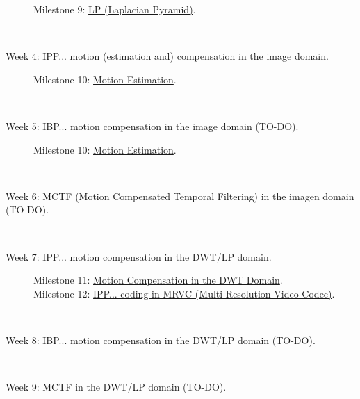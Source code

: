 \begin{description}
\begin{description}
  \item [Milestone 9: {\normalfont \href{}{LP (Laplacian Pyramid)}.}]
  \end{description}
  ~\newline
\item [Week 4: {\normalfont IPP... motion (estimation and) compensation in the image domain.}]
  \begin{description}
  \item [Milestone 10: {\normalfont \href{https://sistemas-multimedia.github.io/milestones/10-ME/}{Motion Estimation}.}] %
  \end{description}
  ~\newline
\item [Week 5: {\normalfont IBP... motion compensation in the image domain (TO-DO).}]
  \begin{description}
  \item [Milestone 10: {\normalfont \href{https://sistemas-multimedia.github.io/milestones/10-ME/}{Motion Estimation}.}] %
  \end{description}
  ~\newline
\item [Week 6: {\normalfont MCTF (Motion Compensated Temporal Filtering) in the imagen domain (TO-DO).}]
  ~\newline
\item [Week 7: {\normalfont IPP... motion compensation in the DWT/LP domain.}]
  \begin{description}
  \item [Milestone 11: {\normalfont \href{https://sistemas-multimedia.github.io/milestones/11-MC_in_DWT_domain/}{Motion Compensation in the DWT Domain}.}]
  \item [Milestone 12: {\normalfont \href{https://sistemas-multimedia.github.io/milestones/12-IPP_coding/}{IPP... coding in MRVC (Multi Resolution Video Codec)}.}]
  \end{description}
  ~\newline
\item [Week 8: {\normalfont IBP... motion compensation in the DWT/LP domain (TO-DO).}]
  ~\newline
\item [Week 9: {\normalfont MCTF in the DWT/LP domain (TO-DO).}]
\end{description}

